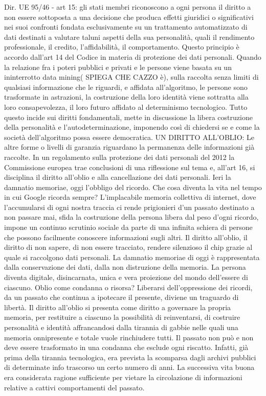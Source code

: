 Dir. UE 95/46 -  art 15: gli stati membri riconoscono a ogni persona il diritto a non essere sottoposta a una decisione che produca effetti giuridici o significativi nei suoi confronti fondata esclusivamente su un trattamento automatizzato di dati destinati a valutare taluni aspetti della sua personalità, quali il rendimento professionale, il credito, l’affidabilità, il comportamento. Questo principio è accordo dall’art 14 del Codice in materia di protezione dei dati personali.
Quando la relazione fra i poteri pubblici e privati e le persone viene basata su un ininterrotto data mining( SPIEGA CHE CAZZO è), sulla raccolta senza limiti di qualsiasi informazione che le riguardi, e affidata all’algoritmo, le persone sono trasformate in astrazioni, la costruzione della loro identità viene sottratta alla loro consapevolezza, il loro futuro affidato al determinismo tecnologico. Tutto questo incide sui diritti fondamentali, mette in discussione la libera costruzione della personalità e l’autodeterminazione, imponendo così di chiedersi se e come la società dell’algoritmo possa essere democratica.
UN DIRITTO ALL’OBLIO:
Le altre forme o livelli di garanzia riguardano la permanenza delle informazioni già raccolte. In un regolamento sulla protezione dei dati personali del 2012 la Commissione europea trae conclusioni di una riflessione sul tema e, all’art 16, si disciplina il diritto all’oblio e alla cancellazione dei dati personali.
Ieri la damnatio memoriae, oggi  l’obbligo del ricordo. Che cosa diventa la vita nel tempo in cui Google ricorda sempre? L’implacabile memoria collettiva di internet, dove l’accumularsi di ogni nostra traccia ci rende prigionieri d’un passato destinato a non passare mai, sfida la costruzione della persona libera dal peso d’ogni ricordo, impone un continuo scrutinio sociale da parte di una infinita schiera di persone che possono facilmente conoscere informazioni sugli altri. Il diritto all’oblio, il diritto di non sapere, di non essere tracciato, rendere silenzioso il chip grazie al quale si raccolgono dati personali. La damnatio memoriae di oggi è rappresentata dalla conservazione dei dati, dalla non distruzione della memoria.
La persona diventa digitale, disincarnata, unica e vera proiezione del mondo dell’essere di ciascuno. 
Oblio come condanna o risorsa? Liberarsi dell’oppressione dei ricordi, da un passato che continua a ipotecare il presente, diviene un traguardo di libertà. Il diritto all’oblio si presenta come diritto a governare la propria memoria, per restituire a ciascuno la possibilità di reinventarsi, di costruire personalità e identità affrancandosi dalla tirannia di gabbie nelle quali una memoria onnipresente e totale vuole rinchiudere tutti.
Il passato non può e non deve essere trasformato in una condanna che esclude ogni riscatto. Infatti, già prima della tirannia tecnologica, era prevista la scomparsa dagli archivi pubblici di determinate info trascorso un certo numero di anni. La successiva vita buona era considerata ragione sufficiente per vietare la circolazione di informazioni relative a cattivi comportamenti del passato. 


